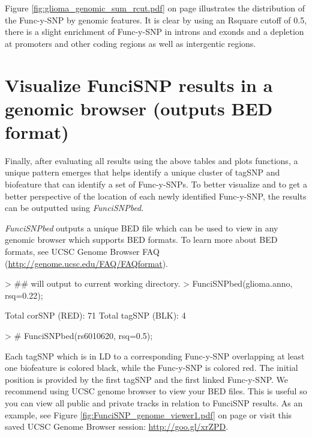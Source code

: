 \documentclass[12pt,fullpage]{article}
\newcommand{\Rmethod}[1]{{\textit{#1}}}
\begin{document}
Figure \ref{fig:glioma_genomic_sum_rcut.pdf} on page                             
\pageref{fig:glioma_genomic_sum_rcut.pdf} illustrates the distribution of the       
Func-y-SNP by genomic features. It is clear by using an Rsquare cutoff of 0.5,   
        there is a slight enrichment of Func-y-SNP in introns and exonds and a          
            depletion at promoters and other coding regions as well as
            intergentic       
                regions.

\newpage


\section{Visualize FunciSNP results in a genomic browser (outputs BED format)}

Finally, after evaluating all results using the above tables and plots
functions, a unique pattern emerges that helps identify a unique cluster of
tagSNP and biofeature that can identify a set of Func-y-SNPs. To better
visualize and to get a better perspective of the location of each newly
identified Func-y-SNP, the results can be outputted using \Rmethod{FunciSNPbed}.

\Rmethod{FunciSNPbed} outputs a unique BED file which can be used to view in any
genomic browser which supports BED formats. To learn more about BED formats, see
UCSC Genome Browser FAQ (\url{http://genome.ucsc.edu/FAQ/FAQformat}). 

\begin{Schunk}
\begin{Sinput}
> ## will output to current working directory.
> FunciSNPbed(glioma.anno, rsq=0.22);
\end{Sinput}
\begin{Soutput}
Total corSNP (RED):  71 
Total tagSNP (BLK):  4 
\end{Soutput}
\begin{Sinput}
> # FunciSNPbed(rs6010620, rsq=0.5);
\end{Sinput}
\end{Schunk}

Each tagSNP which is in LD to a corresponding Func-y-SNP overlapping at least
one biofeature is colored black, while the Func-y-SNP is colored red. The
initial position is provided by the first tagSNP and the first linked
Func-y-SNP. We recommend using UCSC genome browser to view your BED files. This
is useful so you can view all public and private tracks in relation to FunciSNP
results. As an example, see Figure \ref{fig:FunciSNP_genome_viewer1.pdf} on page
\pageref{fig:FunciSNP_genome_viewer1.pdf} or visit this saved UCSC Genome
Browser session: \url{http://goo.gl/xrZPD}.
\end{document}
